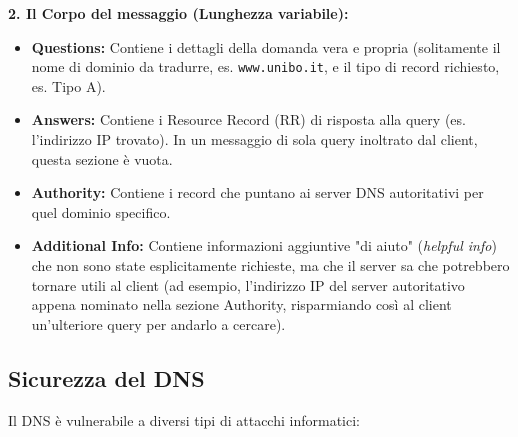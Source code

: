 \documentclass[a4paper,12pt]{report}
\begin{document}
\vspace{0.3cm}
\textbf{2. Il Corpo del messaggio (Lunghezza variabile):}
\begin{itemize}[leftmargin=*]
    \item \textbf{Questions:} Contiene i dettagli della domanda vera e propria (solitamente il nome di dominio da tradurre, es. \texttt{www.unibo.it}, e il tipo di record richiesto, es. Tipo A).
    \item \textbf{Answers:} Contiene i Resource Record (RR) di risposta alla query (es. l'indirizzo IP trovato). In un messaggio di sola query inoltrato dal client, questa sezione è vuota.
    \item \textbf{Authority:} Contiene i record che puntano ai server DNS autoritativi per quel dominio specifico.
    \item \textbf{Additional Info:} Contiene informazioni aggiuntive "di aiuto" (\textit{helpful info}) che non sono state esplicitamente richieste, ma che il server sa che potrebbero tornare utili al client (ad esempio, l'indirizzo IP del server autoritativo appena nominato nella sezione Authority, risparmiando così al client un'ulteriore query per andarlo a cercare).
\end{itemize}



\subsection*{Sicurezza del DNS}

Il DNS è vulnerabile a diversi tipi di attacchi informatici:
\end{document}
